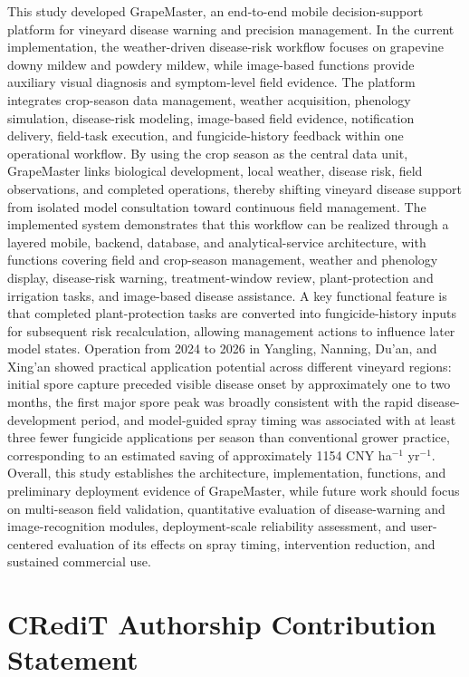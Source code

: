 \documentclass[11pt,a4paper]{article}
\begin{document}
This study developed GrapeMaster, an end-to-end mobile decision-support platform for vineyard disease warning and precision management. In the current implementation, the weather-driven disease-risk workflow focuses on grapevine downy mildew and powdery mildew, while image-based functions provide auxiliary visual diagnosis and symptom-level field evidence. The platform integrates crop-season data management, weather acquisition, phenology simulation, disease-risk modeling, image-based field evidence, notification delivery, field-task execution, and fungicide-history feedback within one operational workflow. By using the crop season as the central data unit, GrapeMaster links biological development, local weather, disease risk, field observations, and completed operations, thereby shifting vineyard disease support from isolated model consultation toward continuous field management. The implemented system demonstrates that this workflow can be realized through a layered mobile, backend, database, and analytical-service architecture, with functions covering field and crop-season management, weather and phenology display, disease-risk warning, treatment-window review, plant-protection and irrigation tasks, and image-based disease assistance. A key functional feature is that completed plant-protection tasks are converted into fungicide-history inputs for subsequent risk recalculation, allowing management actions to influence later model states. Operation from 2024 to 2026 in Yangling, Nanning, Du'an, and Xing'an showed practical application potential across different vineyard regions: initial spore capture preceded visible disease onset by approximately one to two months, the first major spore peak was broadly consistent with the rapid disease-development period, and model-guided spray timing was associated with at least three fewer fungicide applications per season than conventional grower practice, corresponding to an estimated saving of approximately 1154 CNY ha$^{-1}$ yr$^{-1}$. Overall, this study establishes the architecture, implementation, functions, and preliminary deployment evidence of GrapeMaster, while future work should focus on multi-season field validation, quantitative evaluation of disease-warning and image-recognition modules, deployment-scale reliability assessment, and user-centered evaluation of its effects on spray timing, intervention reduction, and sustained commercial use.

\section*{CRediT Authorship Contribution Statement}
\end{document}
